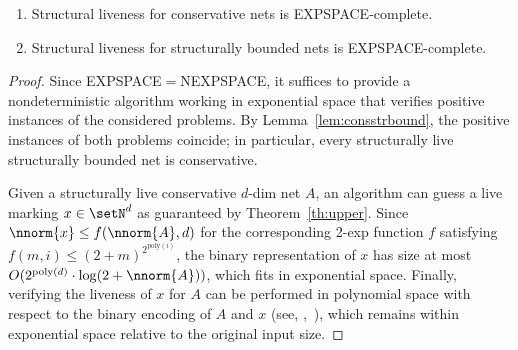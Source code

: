 \begin{cor}\label{cor:conservEScomplete}
\hfill
	\begin{enumerate}
		\item			
	Structural liveness for conservative nets is EXPSPACE-complete.
\item
	Structural liveness for structurally bounded nets is EXPSPACE-complete.
	\end{enumerate}
	\end{cor}	
\begin{proof}
	Since EXPSPACE$=$NEXPSPACE,
it suffices to provide a nondeterministic algorithm working in
	exponential space
	that verifies positive instances of the considered problems.
	By Lemma~\ref{lem:consstrbound}, the positive instances of
	both problems coincide; in particular, every structurally live
	structurally bounded net is conservative. 

	Given a structurally live conservative $d$-dim net $A$, an 
	algorithm can guess a live
	marking $x\in\setN^d$ as guaranteed by Theorem~\ref{th:upper}.
 Since  $\nnorm{x}\leq f(\nnorm{A},d)$ for the corresponding 2-exp function
	$f$
	satisfying	$f(m,i)\leq(2+m)^{2^{\text{poly}(i)}}$, the
	binary representation of $x$ has size at most
	$O(2^{\text{poly}(d)}\cdot\log (2+\nnorm{A}))$, which fits in exponential space.
Finally, verifying the liveness of $x$ for $A$ can be performed in
	polynomial space with respect to
	the binary encoding of $A$ and $x$ (see, \eg,~\cite[Lemma
	5]{DBLP:conf/apn/MayrW14}), which remains within exponential
	space relative to the original input size. 
\end{proof}
